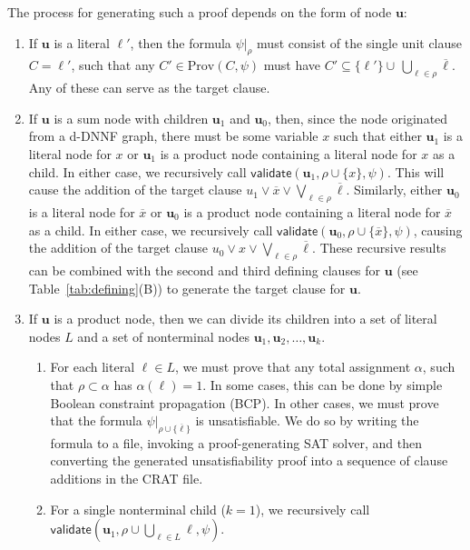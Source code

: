 \documentclass[letterpaper,USenglish,cleveref, autoref, thm-restate]{lipics-v2021}
\newcommand{\obar}[1]{\overline{#1}}
\newcommand{\lit}{\ell}
\newcommand{\passign}{\rho}
\newcommand{\validate}{\textsf{validate}}
\newcommand{\prov}{\textrm{Prov}}
\newcommand{\makenode}[1]{\mathbf{#1}}
\newcommand{\nodeu}{\makenode{u}}
\newcommand{\simplify}[2]{#1|_{#2}}
\begin{document}
The process for generating such a proof depends on the form of node $\nodeu$:
\begin{enumerate}
\item If $\nodeu$ is a literal $\lit'$, then the formula
  $\simplify{\psi}{\passign}$ must consist of the single unit clause
  $C = \lit'$, such that any $C' \in \prov(C, \psi)$ must have $C' \subseteq \{ \lit' \} \cup\, \bigcup_{\lit \in \passign} \obar{\lit}$.
  Any of these can
  serve as the target clause.
\item If $\nodeu$ is a sum node with children $\nodeu_1$ and $\nodeu_0$,
  then, since the node originated from a d-DNNF graph, there must be
  some variable $x$ such that either $\nodeu_1$ is a literal node for $x$ or $\nodeu_1$ is a
  product node containing a literal node for $x$ as a child.  In either case, we
  recursively call $\validate(\nodeu_1, \passign \cup \{ x \}, \psi)$.
  This will cause the addition of the target clause
  $u_1 \lor \obar{x} \lor \bigvee_{\lit \in \passign} \obar{\lit}$.
Similarly, either $\nodeu_0$ is a literal node for $\obar{x}$ or $\nodeu_0$ is a product node containing a literal node for $\obar{x}$ as
  a child.  In either case, we recursively call $\validate(\nodeu_0, \passign \cup \{ \obar{x} \}, \psi)$,
  causing the addition of the target clause
  $u_0 \lor x \lor \bigvee_{\lit \in \passign} \obar{\lit}$.
  These recursive results can be combined with the second and third defining clauses for $\nodeu$
(see Table~\ref{tab:defining}(B))
  to generate the target clause for $\nodeu$.
\item If $\nodeu$ is a product node, then we can divide its children
  into a set of literal nodes $L$ and a set of nonterminal nodes $\nodeu_1, \nodeu_2, \ldots, \nodeu_k$.
  \begin{enumerate}
    \item For each literal
  $\lit \in L$, we must prove that any total assignment $\alpha$, such that
  $\passign \subset \alpha$ has $\alpha(\lit) = 1$.  In some
  cases, this can be done by simple Boolean constraint propagation (BCP).
  In other cases, we must prove that the formula
  $\simplify{\psi}{\passign \cup \{\obar{\lit}\}}$ is unsatisfiable.  We
  do so by writing the formula to a file, invoking a proof-generating
  SAT solver, and then converting the generated unsatisfiability proof
  into a sequence of clause additions in the CRAT file.
\item For a single nonterminal child ($k = 1$), we recursively call
  $\validate \left(\nodeu_1, \passign \cup \bigcup_{\lit \in L} \lit, \psi\right)$.

\end{enumerate}
\end{enumerate}
\end{document}
